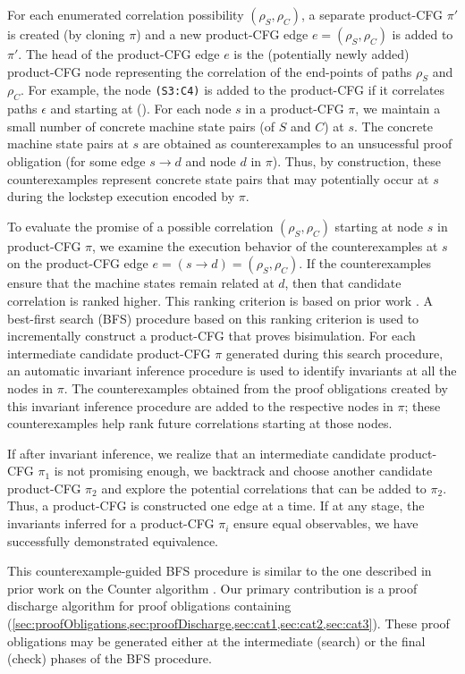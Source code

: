 For each enumerated correlation possibility $(\rho_S,\rho_C)$,
a separate
product-CFG $\pi'$ is created (by cloning $\pi$)
and a new product-CFG
edge $e=(\rho_S,\rho_C)$ is added to $\pi'$.
The head of the product-CFG edge $e$ is the
(potentially newly added) product-CFG node representing
the correlation of the end-points of paths $\rho_S$
and $\rho_C$. For example, the node {\tt (S3:C4)} is added
to the product-CFG if it correlates paths $\epsilon$ and 
starting at ().
For each node $s$ in a product-CFG $\pi$, we maintain
a small number of
concrete machine state pairs (of $S$ and $C$) at $s$.
The concrete
machine state pairs at $s$
are obtained as
counterexamples to an unsucessful proof
obligation  (for
some edge $s \rightarrow d$ and node $d$ in $\pi$).
Thus, by construction, these counterexamples represent
concrete state pairs that
may potentially occur
at $s$ during the lockstep execution encoded
by $\pi$.

To evaluate the promise of a possible correlation
$(\rho_S,\rho_C)$ starting at node $s$
in product-CFG $\pi$,
we examine the execution
behavior of the counterexamples at $s$ on
the product-CFG edge $e=(s\rightarrow d)=(\rho_S,\rho_C)$.
If the counterexamples ensure that the machine
states remain
related at $d$, then that candidate correlation
is ranked higher.
This ranking criterion is based on prior work \cite{oopsla20}.
A best-first search (BFS) procedure based on this ranking
criterion is used to incrementally construct
a product-CFG that proves bisimulation.
For each intermediate candidate product-CFG $\pi$ generated
during this search procedure,
an automatic invariant inference procedure is used
to identify invariants at all the nodes in $\pi$.
The counterexamples
obtained from the proof obligations created
by this invariant inference procedure are added to the
respective nodes in $\pi$; these counterexamples
help rank future correlations starting at those
nodes.

If after invariant inference,
we realize that an intermediate candidate product-CFG $\pi_1$
is not promising enough,
we backtrack and choose another
candidate product-CFG $\pi_2$ and explore the potential correlations that
can be added to $\pi_2$.
Thus, a product-CFG is constructed one edge at a time.
If at any stage, the invariants inferred for a product-CFG
$\pi_i$ ensure equal
observables, we have successfully demonstrated equivalence.

This counterexample-guided BFS procedure
is similar to the one described in prior work on
the Counter algorithm \cite{oopsla20}. Our
primary contribution is a proof discharge
algorithm for proof obligations containing
\recursiveRelations{}
(\cref{sec:proofObligations,sec:proofDischarge,sec:cat1,sec:cat2,sec:cat3}).
These proof obligations may
be generated either at the intermediate (search) or
the final (check)
phases of the BFS procedure.

